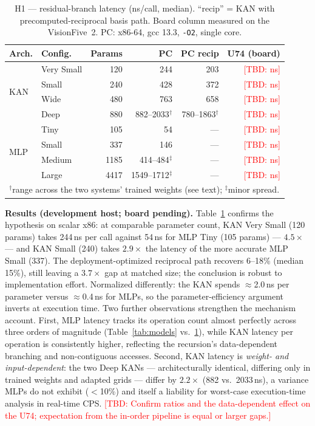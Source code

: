 \documentclass[conference]{IEEEtran}
\newcommand{\tbd}[1]{\textcolor{red}{[TBD: #1]}}
\begin{document}
\begin{table}[t]
\centering
\caption{H1 --- residual-branch latency (ns/call, median). ``recip'' = KAN
with precomputed-reciprocal basis path. Board column measured on the
VisionFive~2. PC: x86-64, gcc 13.3, \texttt{-O2}, single core.}
\label{tab:latency}
\small
\setlength{\tabcolsep}{4pt}
\begin{tabular}{llrrrr}
\toprule
Arch. & Config. & Params & PC & PC recip & U74 (board) \\
\midrule
\multirow{4}{*}{KAN}
 & Very Small & 120 & 244 & 203 & \tbd{ns} \\
 & Small      & 240 & 428 & 372 & \tbd{ns} \\
 & Wide       & 480 & 763 & 658 & \tbd{ns} \\
 & Deep       & 880 & 882--2033$^{\dagger}$ & 780--1863$^{\dagger}$ & \tbd{ns} \\
\midrule
\multirow{4}{*}{MLP}
 & Tiny   & 105  & 54   & --- & \tbd{ns} \\
 & Small  & 337  & 146  & --- & \tbd{ns} \\
 & Medium & 1185 & 414--484$^{\ddagger}$ & --- & \tbd{ns} \\
 & Large  & 4417 & 1549--1712$^{\ddagger}$ & --- & \tbd{ns} \\
\bottomrule
\multicolumn{6}{l}{\footnotesize $^{\dagger}$range across the two systems'
trained weights (see text); $^{\ddagger}$minor spread.}
\end{tabular}
\end{table}

\textbf{Results (development host; board pending).}
Table~\ref{tab:latency} confirms the hypothesis on scalar x86: at comparable
parameter count, KAN Very Small (120 params) takes 244\,ns per call against
54\,ns for MLP Tiny (105 params) --- $4.5\times$ --- and KAN Small (240) takes
$2.9\times$ the latency of the more accurate MLP Small (337). The
deployment-optimized reciprocal path recovers 6--18\% (median 15\%), still
leaving a $3.7\times$ gap at matched size; the conclusion is robust to
implementation effort. Normalized differently: the KAN spends
$\approx$2.0\,ns per parameter versus $\approx$0.4\,ns for MLPs, so the
parameter-efficiency argument inverts at execution time. Two further
observations strengthen the mechanism account. First, MLP latency tracks its
operation count almost perfectly across three orders of magnitude
(Table~\ref{tab:models} vs.~\ref{tab:latency}), while KAN latency per
operation is consistently higher, reflecting the recursion's data-dependent
branching and non-contiguous accesses. Second, KAN latency is
\emph{weight- and input-dependent}: the two Deep KANs --- architecturally
identical, differing only in trained weights and adapted grids --- differ by
$2.2\times$ (882 vs.\ 2033\,ns), a variance MLPs do not exhibit ($<$10\%) and
itself a liability for worst-case execution-time analysis in real-time CPS.
\tbd{Confirm ratios and the data-dependent effect on the U74; expectation
from the in-order pipeline is equal or larger gaps.}
\end{document}
